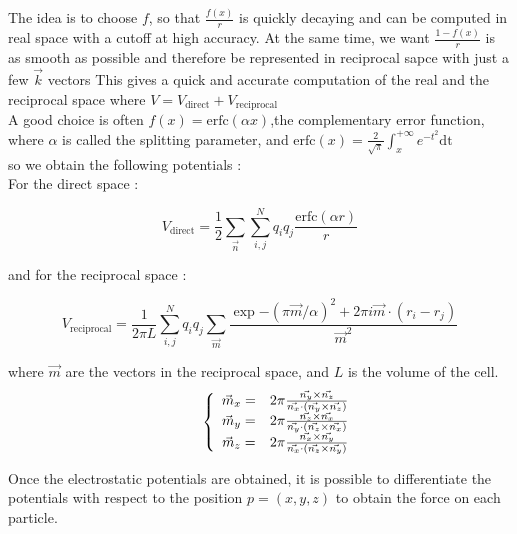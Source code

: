 \documentclass[12pt,twoside,a4paper]{report}
\begin{document}
The idea is to choose $f$, so that $\frac{f(x)}{r}$ is quickly decaying and can be computed in real space with a cutoff at high accuracy. At the same time, we want $\frac{1 - f(x)}{r}$ is as smooth as possible and therefore be represented in reciprocal sapce with just a few $\vec{k}$ vectors This gives a quick and accurate computation of the real and the reciprocal space where $V = V_{\text{direct}} + V_{\text{reciprocal}}$\\

A good choice is often $f(x) = \text{erfc}(\alpha x)$,the complementary error function, where $\alpha$ is called the splitting parameter, and $\text{erfc}(x) = \frac{2}{\sqrt{\pi}} \int_{x}^{+\infty}{e^{-t^2}\text{dt}} $\\

so we obtain the following potentials :\\

For the direct space :

\begin{equation}
   V_{\text{direct}} =  \frac{1}{2} \sum_{\vec{n}} \sum_{i,j}^{N} q_i q_j \frac{\text{erfc}(\alpha r)}{r}
\end{equation}

and for the reciprocal space :

\begin{equation}
\label{Vrecip}
	V_{\text{reciprocal}} = \frac{1}{2 \pi L} \sum_{i,j}^{N} q_i q_j \sum_{\vec{m}}\frac{\exp{-(\pi \overrightarrow{m}/\alpha)^2} +2\pi i \overrightarrow{m} \cdot (r_i - r_j)}{\overrightarrow{m}^2}
\end{equation}

where $\vec{m}$ are the vectors in the reciprocal space, and $L$ is the volume of the cell.\\

\begin{equation*}
\hspace{10 mm}
\left\lbrace
\begin{array}{ccc}
\vec{m}_x = & 2\pi \frac{\vec{n_y}\times\vec{n_z}}   {\vec{n_x}\cdot(\vec{n_y}\times\vec{n_z})}         \\
\vec{m}_y = &  2\pi \frac{\vec{n_z}\times\vec{n_x}}   {\vec{n_y}\cdot(\vec{n_z}\times\vec{n_x})} \\
\vec{m}_z = & 2\pi \frac{\vec{n_x}\times\vec{n_y}}   {\vec{n_x}\cdot(\vec{n_z}\times\vec{n_y})} 
\end{array}\right.
\end{equation*}


Once the electrostatic potentials are obtained, it is possible to differentiate the potentials with respect to the position $p=(x,y,z)$ to obtain the force on each particle.\\
\end{document}
